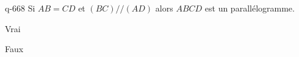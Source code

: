 \begin{truefalse}{q-668}
 Si $AB=CD$ et $(BC)//(AD)$ alors $ABCD$ est un parallélogramme.
\item Vrai
\item* Faux
\end{truefalse}

